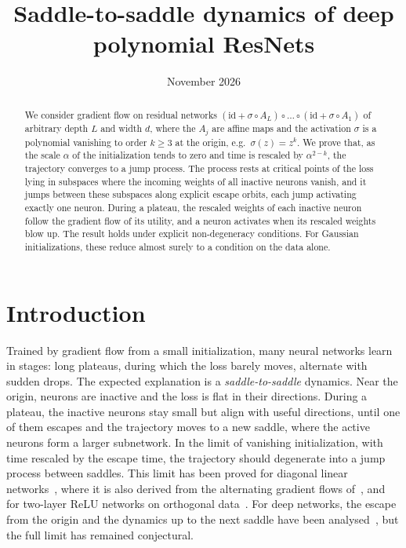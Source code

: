 \documentclass[11pt]{article}
\title{Saddle-to-saddle dynamics of deep polynomial ResNets}
\author{}
\date{November 2026}
\theoremstyle{definition}
\theoremstyle{remark}
\numberwithin{equation}{section}
\newcommand{\id}{\mathrm{id}}
\begin{document}
\maketitle

\begin{abstract}
We consider gradient flow on residual networks $(\id+\sigma\circ A_L)\circ\dots\circ(\id+\sigma\circ A_1)$ of arbitrary depth $L$ and width $d$, where the $A_j$ are affine maps and the activation $\sigma$ is a polynomial vanishing to order $k\ge3$ at the origin, e.g.\ $\sigma(z)=z^k$. We prove that, as the scale $\alpha$ of the initialization tends to zero and time is rescaled by $\alpha^{2-k}$, the trajectory converges to a jump process. The process rests at critical points of the loss lying in subspaces where the incoming weights of all inactive neurons vanish, and it jumps between these subspaces along explicit escape orbits, each jump activating exactly one neuron. During a plateau, the rescaled weights of each inactive neuron follow the gradient flow of its utility, and a neuron activates when its rescaled weights blow up. The result holds under explicit non-degeneracy conditions. For Gaussian initializations, these reduce almost surely to a condition on the data alone.
\end{abstract}

\section{Introduction}

Trained by gradient flow from a small initialization, many neural networks learn in stages: long plateaus, during which the loss barely moves, alternate with sudden drops. The expected explanation is a \emph{saddle-to-saddle} dynamics. Near the origin, neurons are inactive and the loss is flat in their directions. During a plateau, the inactive neurons stay small but align with useful directions, until one of them escapes and the trajectory moves to a new saddle, where the active neurons form a larger subnetwork. In the limit of vanishing initialization, with time rescaled by the escape time, the trajectory should degenerate into a jump process between saddles. This limit has been proved for diagonal linear networks~\cite{PF23}, where it is also derived from the alternating gradient flows of~\cite{KMC25}, and for two-layer ReLU networks on orthogonal data~\cite{TBLEL26}. For deep networks, the escape from the origin and the dynamics up to the next saddle have been analysed~\cite{JGSHG21,KH24,KH24b,KH25,BSJ25}, but the full limit has remained conjectural.
\end{document}
